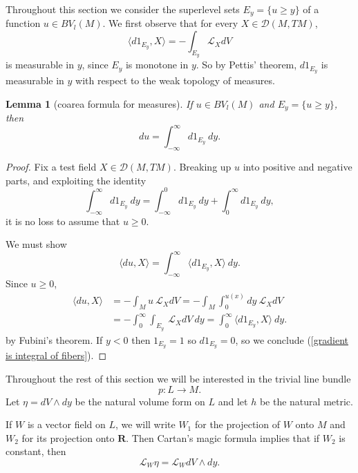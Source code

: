 \documentclass[reqno,12pt,letterpaper]{amsart}
\newcommand{\RR}{\mathbf{R}}
\newtheorem{lemma}[theorem]{Lemma}
\theoremstyle{definition}
\numberwithin{equation}{section}
\begin{document}
Throughout this section we consider the superlevel sets $E_y = \{u \geq y\}$ of a function $u \in BV_l(M)$.
We first observe that for every $X \in \mathcal D(M, TM)$,
$$\langle d1_{E_y}, X\rangle = -\int_{E_y} \mathcal L_XdV$$
is measurable in $y$, since $E_y$ is monotone in $y$.
So by Pettis' theorem, $d1_{E_y}$ is measurable in $y$ with respect to the weak topology of measures.

\begin{lemma}[coarea formula for measures]\label{Coarea1}
If $u \in BV_l(M)$ and $E_y = \{u \geq y\}$, then
$$du = \int_{-\infty}^\infty d1_{E_y} ~dy.$$
\end{lemma}
\begin{proof}
Fix a test field $X \in \mathcal D(M, TM)$.
Breaking up $u$ into positive and negative parts, and exploiting the identity
$$\int_{-\infty}^\infty d1_{E_y} ~dy = \int_{-\infty}^0 d1_{E_y} ~dy + \int_0^\infty d1_{E_y} ~dy,$$
it is no loss to assume that $u \geq 0$.

We must show
\begin{equation}
\label{gradient is integral of fibers}
\langle du, X\rangle = \int_{-\infty}^\infty \langle d1_{E_y}, X\rangle ~dy.
\end{equation}
Since $u \geq 0$,
\begin{align*}
\langle du, X\rangle &= -\int_M u~\mathcal L_XdV = -\int_M \int_0^{u(x)} dy ~\mathcal L_XdV\\
&= -\int_0^\infty \int_{E_y} ~\mathcal L_XdV ~dy = \int_0^\infty \langle d1_{E_y}, X\rangle ~dy.
\end{align*}
by Fubini's theorem.
If $y < 0$ then $1_{E_y} = 1$ so $d1_{E_y} = 0$, so we conclude (\ref{gradient is integral of fibers}).
\end{proof}

Throughout the rest of this section we will be interested in the trivial line bundle
$$p: L \to M.$$
Let $\eta = dV \wedge dy$ be the natural volume form on $L$ and let $h$ be the natural metric.

If $W$ is a vector field on $L$, we will write $W_1$ for the projection of $W$ onto $M$ and $W_2$ for its projection onto $\RR$.
Then Cartan's magic formula implies that if $W_2$ is constant, then
\begin{equation}
\label{Lie derivative computation}
\mathcal L_W\eta = \mathcal L_WdV \wedge dy.
\end{equation}
\end{document}
